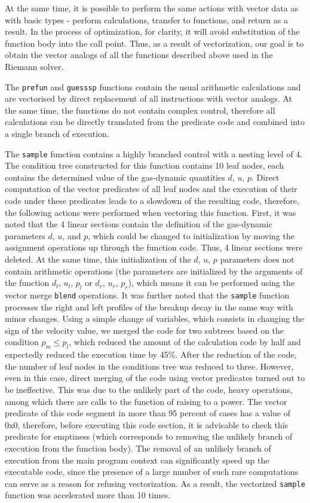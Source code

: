 \documentclass[
11pt,%
tightenlines,%
twoside,%
onecolumn,%
nofloats,%
nobibnotes,%
nofootinbib,%
superscriptaddress,%
noshowpacs,%
centertags]%
{revtex4}
\begin{document}
At the same time, it is possible to perform the same actions with vector data as with basic types - perform calculations, transfer to functions, and return as a result.
In the process of optimization, for clarity, it will avoid substitution of the function body into the call point. Thus, as a result of vectorization, our goal is to obtain the vector analogs of all the functions described above used in the Riemann solver.

The \texttt{prefun} and \texttt{guesssp} functions contain the usual arithmetic calculations and are vectorised by direct replacement of all instructions with vector analogs.
At the same time, the functions do not contain complex control, therefore all calculations can be directly translated from the predicate code and combined into a single branch of execution.

The \texttt{sample} function contains a highly branched control with a nesting level of 4.
The condition tree constructed for this function contains 10 leaf nodes, each contains the determined value of the gas-dynamic quantities $d$, $u$, $p$.
Direct computation of the vector predicates of all leaf nodes and the execution of their code under these predicates leads to a slowdown of the resulting code, therefore, the following actions were performed when vectoring this function.
First, it was noted that the 4 linear sections contain the definition of the gas-dynamic parameters $d$, $u$, and $p$, which could be changed to initialization by moving the assignment operations up through the function code.
Thus, 4 linear sections were deleted.
At the same time, this initialization of the $d$, $u$, $p$ parameters does not contain arithmetic operations (the parameters are initialized by the arguments of the function $d_l$, $u_l$, $p_l$ or $d_r$, $u_r$, $p_r$), which means it can be performed using the vector merge \texttt{blend} operations.
It was further noted that the \texttt{sample} function processes the right and left profiles of the breakup decay in the same way with minor changes.
Using a simple change of variables, which consists in changing the sign of the velocity value, we merged the code for two subtrees based on the condition $p_m \le p_l$, which reduced the amount of the calculation code by half and expectedly reduced the execution time by 45\%.
After the reduction of the code, the number of leaf nodes in the conditions tree was reduced to three.
However, even in this case, direct merging of the code using vector predicates turned out to be ineffective.
This was due to the unlikely part of the code, heavy operations, among which there are calls to the function of raising to a power.
The vector predicate of this code segment in more than 95 percent of cases has a value of 0x0, therefore, before executing this code section, it is advisable to check this predicate for emptiness (which corresponds to removing the unlikely branch of execution from the function body).
The removal of an unlikely branch of execution from the main program context can significantly speed up the executable code, since the presence of a large number of such rare computations can serve as a reason for refusing vectorization.
As a result, the vectorized \texttt{sample} function was accelerated more than 10 times.
\end{document}
